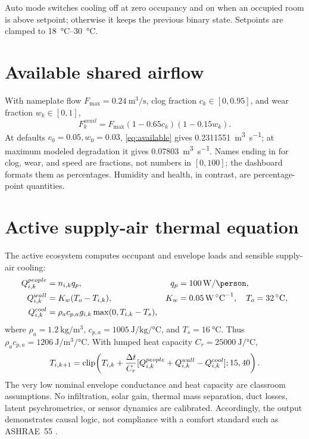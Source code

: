 Auto mode switches cooling off at zero occupancy and on when an occupied room is above setpoint; otherwise it keeps the previous binary state. Setpoints are clamped to \SIrange{18}{30}{\celsius}.

\section{Available shared airflow}
With nameplate flow $F_{\max}=\SI{0.24}{\meter\cubed\per\second}$, clog fraction $c_k\in[0,0.95]$, and wear fraction $w_k\in[0,1]$,
\begin{equation}
F^{avail}_k=F_{\max}(1-0.65c_k)(1-0.15w_k).
\label{eq:available}
\end{equation}
At defaults $c_0=0.05,w_0=0.03$, \cref{eq:available} gives \SI{0.2311551}{\meter\cubed\per\second}; at maximum modeled degradation it gives \SI{0.07803}{\meter\cubed\per\second}. Names ending in  for clog, wear, and speed are fractions, not numbers in $[0,100]$; the dashboard formats them as percentages. Humidity and health, in contrast, are percentage-point quantities.

\section{Active supply-air thermal equation}
The active ecosystem computes occupant and envelope loads and sensible supply-air cooling:
\begin{align}
Q^{people}_{i,k}&=n_{i,k}q_p, & q_p&=\SI{100}{\watt\per\person},\\
Q^{wall}_{i,k}&=K_w(T_o-T_{i,k}), &K_w&=\SI{0.05}{\watt\per\celsius},\quad T_o=\SI{32}{\celsius},\\
Q^{cool}_{i,k}&=\rho_ac_{p,a}g_{i,k}\max(0,T_{i,k}-T_s),
\end{align}
where $\rho_a=\SI{1.2}{\kilogram\per\meter\cubed}$, $c_{p,a}=\SI{1005}{\joule\per\kilogram\per\celsius}$, and $T_s=\SI{16}{\celsius}$. Thus $\rho_ac_{p,a}=\SI{1206}{\joule\per\meter\cubed\per\celsius}$. With lumped heat capacity $C_r=\SI{25000}{\joule\per\celsius}$,
\begin{equation}
T_{i,k+1}=\operatorname{clip}\!\left(T_{i,k}+\frac{\Delta t}{C_r}[Q^{people}_{i,k}+Q^{wall}_{i,k}-Q^{cool}_{i,k}];15,40\right).
\label{eq:thermal}
\end{equation}
The very low nominal envelope conductance and heat capacity are classroom assumptions. No infiltration, solar gain, thermal mass separation, duct losses, latent psychrometrics, or sensor dynamics are calibrated. Accordingly, the output demonstrates causal logic, not compliance with a comfort standard such as ASHRAE~55 \citep{ashrae55}.

